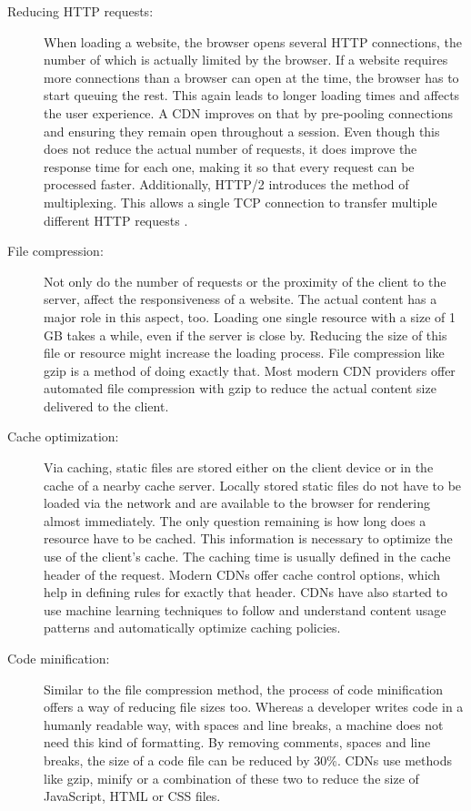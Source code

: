 \begin{description}
	\item[Reducing HTTP requests:] When loading a website, the browser opens several HTTP connections, the number of which is actually limited by the browser. If a website requires more connections than a browser can open at the time, the browser has to start queuing the rest. This again leads to longer loading times and affects the user experience. A CDN improves on that by pre-pooling connections and ensuring they remain open throughout a session. Even though this does not reduce the actual number of requests, it does improve the response time for each one, making it so that every request can be processed faster. Additionally, HTTP/2 introduces the method of multiplexing. This allows a single TCP connection to transfer multiple different HTTP requests \cite{http2}.
	
	\item[File compression:] Not only do the number of requests or the proximity of the client to the server, affect the responsiveness of a website. The actual content has a major role in this aspect, too. Loading one single resource with a size of 1 GB takes a while, even if the server is close by. Reducing the size of this file or resource might increase the loading process. File compression like gzip is a method of doing exactly that. Most modern CDN providers offer automated file compression with gzip to reduce the actual content size delivered to the client.
	
	\item[Cache optimization:] Via caching, static files are stored either on the client device or in the cache of a nearby cache server. Locally stored static files do not have to be loaded via the network and are available to the browser for rendering almost immediately. The only question remaining is how long does a resource have to be cached. This information is necessary to optimize the use of the client's cache. The caching time is usually defined in the cache header of the request. Modern CDNs offer cache control options, which help in defining rules for exactly that header.
	CDNs have also started to use machine learning techniques to follow and understand content usage patterns and automatically optimize caching policies.
	
	\item[Code minification:] Similar to the file compression method, the process of code minification offers a way of reducing file sizes too. Whereas a developer writes code in a humanly readable way, with spaces and line breaks, a machine does not need this kind of formatting. By removing comments, spaces and line breaks, the size of a code file can be reduced by 30\%. CDNs use methods like gzip, minify or a combination of these two to reduce the size of JavaScript, HTML or CSS files.
	

\end{description}
